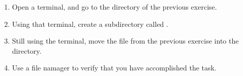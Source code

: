 \begin{enumerate}
  \item Open a terminal, and go to the directory of the previous exercise.
  \item Using that terminal, create a subdirectory called .
  \item Still using the terminal, move the file from the previous exercise into the  directory.
  \item Use a file namager to verify that you have accomplished the task.
\end{enumerate}

